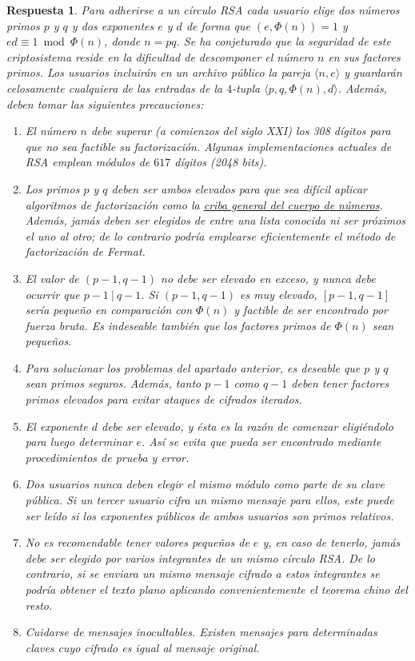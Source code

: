 \documentclass[
  a4paper,
  spanish,
  12pt,
]{scrartcl}
\theoremstyle{ejercicio-style}
\theoremstyle{remark-style}
\newtheorem*{sol}{Respuesta}
\theoremstyle{teorema-style}
\begin{document}
\begin{sol}
  Para adherirse a un círculo RSA cada usuario elige dos números primos $p$ y $q$ y dos exponentes $e$ y $d$ de forma que $(e, \Phi(n)) = 1$ y $ed \equiv 1 \bmod \Phi(n)$, donde $n=pq$. Se ha conjeturado que la seguridad de este criptosistema reside en la dificultad de descomponer el número $n$ en sus factores primos. Los usuarios incluirán en un archivo público la pareja $\langle n, e\rangle$ y guardarán celosamente cualquiera de las entradas de la $4$-tupla $\langle p, q, \Phi(n), d \rangle$. Además, deben tomar las siguientes precauciones:
  \begin{enumerate}
    \item El número $n$ debe superar (a comienzos del siglo XXI) los 308 dígitos para que no sea factible su factorización. Algunas implementaciones actuales de RSA emplean módulos de $617$ dígitos (2048 bits).
    \item Los primos $p$ y $q$ deben ser ambos elevados para que sea difícil aplicar algoritmos de factorización como la \href{https://en.wikipedia.org/wiki/General_number_field_sieve}{criba general del cuerpo de números}. Además, jamás deben ser elegidos de entre una lista conocida ni ser próximos el uno al otro; de lo contrario podría emplearse eficientemente el método de factorización de Fermat.
    \item El valor de $(p-1, q-1)$ no debe ser elevado en exceso, y nunca debe ocurrir que $p-1 \ | \ q-1$. Si $(p-1, q-1)$ es muy elevado, $[p-1, q-1]$ sería pequeño en comparación con $\Phi(n)$ y factible de ser encontrado por fuerza bruta. Es indeseable también que los factores primos de $\Phi(n)$ sean pequeños.
    \item Para solucionar los problemas del apartado anterior, es deseable que $p$ y $q$ sean \textit{primos seguros}. Además, tanto $p-1$ como $q-1$ deben tener factores primos elevados para evitar ataques de cifrados iterados.
    \item El exponente $d$ debe ser elevado, y ésta es la razón de comenzar eligiéndolo para luego determinar $e$. Así se evita que pueda ser encontrado mediante procedimientos de prueba y error.
    \item Dos usuarios nunca deben elegir el mismo módulo como parte de su clave pública. Si un tercer usuario cifra un mismo mensaje para ellos, este puede ser leído si los exponentes públicos de ambos usuarios son primos relativos.
    \item No es recomendable tener valores pequeños de $e$ y, en caso de tenerlo, jamás debe ser elegido por varios integrantes de un mismo círculo RSA. De lo contrario, si se enviara un mismo mensaje cifrado a estos integrantes se podría obtener el texto plano aplicando convenientemente el \textit{teorema chino del resto}.
    \item Cuidarse de mensajes inocultables. Existen mensajes para determinadas claves cuyo cifrado es igual al mensaje original.
  \end{enumerate}
\end{sol}
\end{document}
